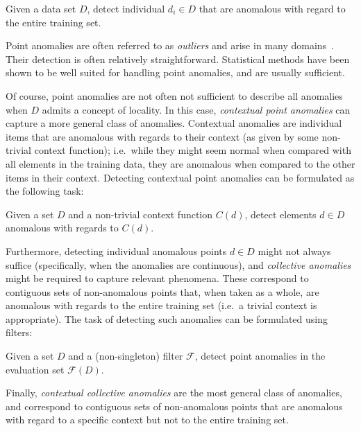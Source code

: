 \begin{task}
\label{task:point}
  Given a data set $D$, detect individual $d_i \in D$ that are anomalous with regard to the entire training set.
\end{task}

Point anomalies are often referred to as \emph{outliers} and arise in many domains~\cite{eskin}. Their detection is often relatively straightforward. Statistical methods have been shown to be well suited for handling point anomalies, and are usually sufficient.

Of course, point anomalies are not often not sufficient to describe all anomalies when $D$ admits a concept of locality. In this case, \emph{contextual point anomalies} can capture a more general class of anomalies. Contextual anomalies are individual items that are anomalous with regards to their context (as given by some non-trivial context function); i.e.\ while they might seem normal when compared with all elements in the training data, they are anomalous when compared to the other items in their context. Detecting contextual point anomalies can be formulated as the following task:

\begin{task}
\label{task:contextual}
  Given a set $D$ and a non-trivial context function $C(d)$, detect elements $d \in D$ anomalous with regards to $C(d)$.
\end{task}

Furthermore, detecting individual anomalous points $d \in D$ might not always suffice (specifically, when the anomalies are continuous), and \emph{collective anomalies} might be required to capture relevant phenomena. These correspond to contiguous sets of non-anomalous points that, when taken as a whole, are anomalous with regards to the entire training set (i.e.\ a trivial context is appropriate). The task of detecting such anomalies can be formulated using filters:

\begin{task}
\label{task:collective}
  Given a set $D$ and a (non-singleton) filter $\mathcal{F}$, detect point anomalies in the evaluation set $\mathcal{F}(D)$.
\end{task}

Finally, \emph{contextual collective anomalies} are the most general class of anomalies, and correspond to contiguous sets of non-anomalous points that are anomalous with regard to a specific context but not to the entire training set.

